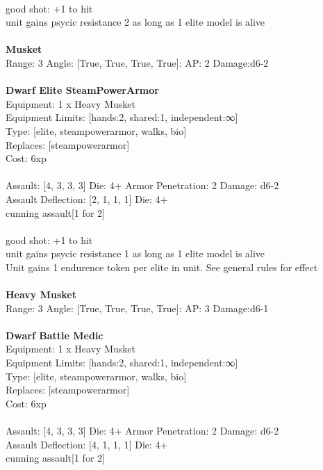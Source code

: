 \ \\
good shot: +1 to hit\\ 
unit gains psycic resistance 2 as long as 1 elite model is alive\\ 

\ \\
{\bf Musket } \\



Range: 3  Angle: [True, True, True, True]: AP: 2 Damage:d6-2 \\




 
\ \\

{\bf Dwarf Elite SteamPowerArmor } \\
Equipment: 1 x Heavy Musket \\
Equipment Limits: [hands:2, shared:1, independent:∞] \\
Type: [elite, steampowerarmor, walks, bio] \\
Replaces: [steampowerarmor] \\
Cost: 6xp\\
\ \\
Assault: [4, 3, 3, 3] Die: 4+ Armor Penetration: 2 Damage: d6-2 \\
Assault Deflection: [2, 1, 1, 1] Die: 4+\\
\indent cunning assault[1 for 2]\\ 
 
\ \\
good shot: +1 to hit\\ 
unit gains psycic resistance 1 as long as 1 elite model is alive\\ 
Unit gains 1 endurence token per elite in unit. See general rules for effect\\ 

\ \\
{\bf Heavy Musket } \\



Range: 3  Angle: [True, True, True, True]: AP: 3 Damage:d6-1 \\




 
\ \\

{\bf Dwarf Battle Medic } \\
Equipment: 1 x Heavy Musket \\
Equipment Limits: [hands:2, shared:1, independent:∞] \\
Type: [elite, steampowerarmor, walks, bio] \\
Replaces: [steampowerarmor] \\
Cost: 6xp\\
\ \\
Assault: [4, 3, 3, 3] Die: 4+ Armor Penetration: 2 Damage: d6-2 \\
Assault Deflection: [4, 1, 1, 1] Die: 4+\\
\indent cunning assault[1 for 2]\\ 
 

